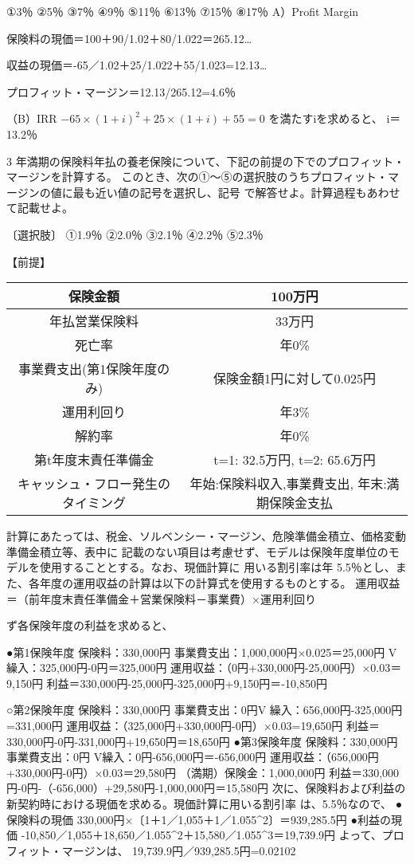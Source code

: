 \documentclass[report,gutter=10mm,fore-edge=10mm,uplatex,dvipdfmx]{jlreq}
\begin{document}
①3％ ②5％ ③7％ ④9％ ⑤11％ ⑥13％ ⑦15％ ⑧17％
\answer{}
A）Profit Margin

保険料の現価＝100＋90/1.02＋80/1.022＝265.12…

収益の現価＝-65／1.02＋25/1.022＋55/1.023=12.13…

プロフィット・マージン＝12.13/265.12=4.6％

（B）IRR
$-65\times(1+i)^2+25\times(1+i)+55=0$ を満たすiを求めると、
i＝13.2％

3 年満期の保険料年払の養老保険について、下記の前提の下でのプロフィット・マージンを計算する。
このとき、次の①～⑤の選択肢のうちプロフィット・マージンの値に最も近い値の記号を選択し、記号
で解答せよ。計算過程もあわせて記載せよ。

〔選択肢〕
①1.9％ ②2.0％ ③2.1％
④2.2％ ⑤2.3％

【前提】

\begin{tabular}{|c|c|}
\hline 保険金額& 100万円\\ \hline
 年払営業保険料& 33万円\\ \hline
 死亡率&年0\%\\ \hline
 事業費支出(第1保険年度のみ)&保険金額1円に対して0.025円\\ \hline
 運用利回り&年3\%\\ \hline
 解約率&年0\%\\ \hline
 第t年度末責任準備金&t=1: 32.5万円, t=2: 65.6万円\\ \hline
キャッシュ・フロー発生のタイミング &年始:保険料収入,事業費支出, 年末:満期保険金支払 \\ \hline
\end{tabular}

計算にあたっては、税金、ソルベンシー・マージン、危険準備金積立、価格変動準備金積立等、表中に
記載のない項目は考慮せず、モデルは保険年度単位のモデルを使用することとする。なお、現価計算に
用いる割引率は年 5.5％とし、また、各年度の運用収益の計算は以下の計算式を使用するものとする。
運用収益＝（前年度末責任準備金＋営業保険料－事業費）×運用利回り

\answer{}
ず各保険年度の利益を求めると、

●第1保険年度
保険料：330,000円
事業費支出：1,000,000円×0.025＝25,000円
V繰入：325,000円-0円＝325,000円
運用収益：（0円+330,000円-25,000円）×0.03＝9,150円
利益＝330,000円-25,000円-325,000円+9,150円＝-10,850円

○第2保険年度
保険料：330,000円
事業費支出：0円V
繰入：656,000円-325,000円=331,000円
運用収益：（325,000円+330,000円-0円）×0.03=19,650円
利益＝330,000円-0円-331,000円+19,650円＝18,650円
●第3保険年度
保険料：330,000円
事業費支出：0円
V繰入：0円-656,000円＝-656,000円
運用収益：（656,000円+330,000円-0円）×0.03＝29,580円
（満期）保険金：1,000,000円
利益＝330,000円-0円-（-656,000）+29,580円-1,000,000円＝15,580円
次に、保険料および利益の新契約時における現価を求める。現価計算に用いる割引率
は、5.5％なので、
●保険料の現価
330,000円×〔1＋1／1,055＋1／1.055^2〕＝939,285.5円
●利益の現価
-10,850／1,055＋18,650／1.055^2＋15,580／1.055^3＝19,739.9円
よって、プロフィット・マージンは、
19,739.9円／939,285.5円=0.02102
\end{document}
